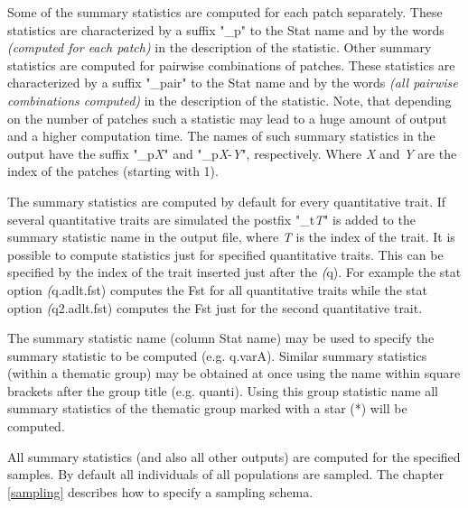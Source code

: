 \documentclass[letterpaper,12pt,oneside]{book}
\begin{document}
Some of the summary statistics are computed for each patch separately. These statistics are characterized by a suffix "\_p" to the \textsf{Stat name} and by the words \textit{(computed for each patch)} in the description of the statistic. Other summary statistics are computed for pairwise combinations of patches. These statistics are characterized by a suffix "\_pair" to the \textsf{Stat name} and by the words \textit{(all pairwise combinations computed)} in the description of the statistic. Note, that depending on the number of patches such a statistic may lead to a huge amount of output and a higher computation time. The names of such summary statistics in the output have the suffix "\_p\textit{X}" and "\_p\textit{X}-\textit{Y}", respectively. Where \textit{X} and \textit{Y} are the index of the patches (starting with 1). 

The summary statistics are computed by default for every quantitative trait. If several quantitative traits are simulated the postfix "\_t\textit{T}" is added to the summary statistic name in the output file, where \textit{T} is the index of the trait. It is possible to compute statistics just for specified quantitative traits. This can be specified by the index of the trait inserted just after the \textit(q). For example the stat option \textit(q.adlt.fst) computes the Fst for all quantitative traits while the stat option \textit(q2.adlt.fst) computes the Fst just for the second quantitative trait. 

The summary statistic name (column \textsf{Stat name}) may be used to specify the summary statistic to be computed (e.g. \textsf{q.varA}). Similar summary statistics (within a thematic group) may be obtained at once using the name within square brackets after the group title (e.g. \textsf{quanti}). Using this group statistic name all summary statistics of the thematic group marked with a star (*) will be computed. 

All summary statistics (and also all other outputs) are computed for the specified samples. By default all individuals of all populations are sampled. The chapter \ref{sampling} describes how to specify a sampling schema.
\\
\\
\end{document}
